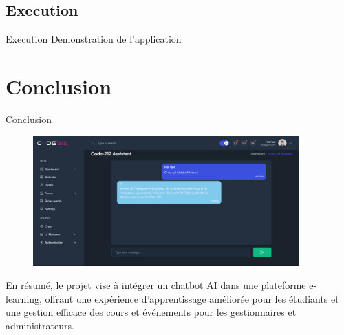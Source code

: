 \documentclass{beamer}
\begin{document}
\subsection{Execution}
\begin{frame}{Execution}
    Demonstration de l'application
\end{frame}

\section{Conclusion}

\begin{frame}{Conclusion}
    \begin{figure}[htpb]
        \centering
        \includegraphics[height=5cm]{pic/chat1.png}
    \end{figure}
    En résumé, le projet vise à intégrer un chatbot AI dans une plateforme e-learning, offrant une expérience d’apprentissage améliorée pour les étudiants et une gestion efficace des cours et événements pour les gestionnaires et administrateurs.
\end{frame}
\end{document}
